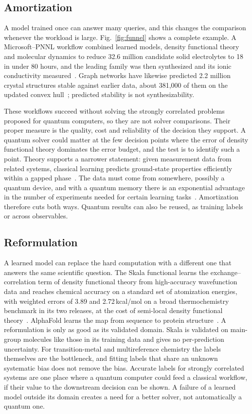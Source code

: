 \subsection{Amortization}
A model trained once can answer many queries, and this changes the comparison whenever the workload is large. Fig.~\ref{fig:funnel} shows a complete example. A Microsoft--PNNL workflow combined learned models, density functional theory and molecular dynamics to reduce 32.6 million candidate solid electrolytes to 18 in under 80 hours, and the leading family was then synthesized and its ionic conductivity measured~\cite{chen2024}. Graph networks have likewise predicted 2.2 million crystal structures stable against earlier data, about 381{,}000 of them on the updated convex hull~\cite{merchant2023}; predicted stability is not synthesizability.



These workflows succeed without solving the strongly correlated problems proposed for quantum computers, so they are not solver comparisons. Their proper measure is the quality, cost and reliability of the decision they support. A quantum solver could matter at the few decision points where the error of density functional theory dominates the error budget, and the test is to identify such a point. Theory supports a narrower statement: given measurement data from related systems, classical learning predicts ground-state properties efficiently within a gapped phase~\cite{huang2022}. The data must come from somewhere, possibly a quantum device, and with a quantum memory there is an exponential advantage in the number of experiments needed for certain learning tasks~\cite{huang2022exp}. Amortization therefore cuts both ways. Quantum results can also be reused, as training labels or across observables.

\subsection{Reformulation}
A learned model can replace the hard computation with a different one that answers the same scientific question. The Skala functional learns the exchange--correlation term of density functional theory from high-accuracy wavefunction data and reaches chemical accuracy on a standard set of atomization energies, with weighted errors of 3.89 and 2.72\,kcal/mol on a broad thermochemistry benchmark in its two releases, at the cost of semi-local density functional theory~\cite{luise2025,skala10,skala11}. AlphaFold learns the map from sequence to protein structure~\cite{jumper2021}. A reformulation is only as good as its validated domain. Skala is validated on main-group molecules like those in its training data and gives no per-prediction uncertainty. For transition-metal and multireference chemistry the labels themselves are the bottleneck, and fitting labels that share an unknown systematic bias does not remove the bias. Accurate labels for strongly correlated systems are one place where a quantum computer could feed a classical workflow, if their value to the downstream decision can be shown. A failure of a learned model outside its domain creates a need for a better solver, not automatically a quantum one.

